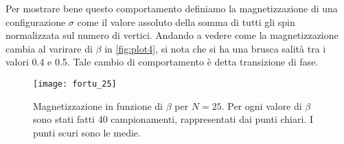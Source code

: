 \documentclass[]{marticle}
\begin{document}
Per mostrare bene questo comportamento definiamo la magnetizzazione di una
configurazione $\sigma$ come il valore assoluto della somma di tutti gli spin
normalizzata sul numero di vertici. Andando a vedere come la magnetizzazione
cambia al varirare di $\beta$ in \ref{fig:plot4}, si nota che si ha una brusca
salit\`a tra i valori 0.4 e 0.5. Tale cambio di comportamento \`e detta
transizione di fase. 

\begin{figure}[h!]
\caption{Magnetizzazione in funzione di $\beta$ per $N=25$. Per ogni valore di
    $\beta$ sono stati fatti 40 campionamenti, rappresentati dai punti chiari. I
    punti scuri sono le medie.}
\texttt{[image: fortu\_25]}
\label{fig:plot2}
\centering
\end{figure}
\end{document}
